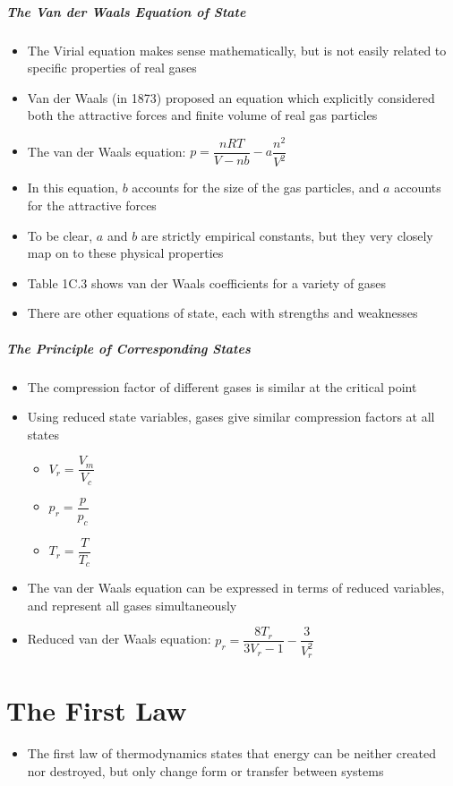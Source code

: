 \documentclass[12pt, openany, letterpaper]{memoir}
\begin{document}
\paragraph{The Van der Waals Equation of State}
\begin{itemize}
	\item The Virial equation makes sense mathematically, but is not easily related to specific properties of real gases
	\item Van der Waals (in 1873) proposed an equation which explicitly considered both the attractive forces and finite volume of real gas particles
	\item The van der Waals equation: $p=\dfrac{nRT}{V-nb}-a\dfrac{n^2}{V^2}$
	\item In this equation, $b$ accounts for the size of the gas particles, and $a$ accounts for the attractive forces
	\item To be clear, $a$ and $b$ are strictly empirical constants, but they very closely map on to these physical properties
	\item Table 1C.3 shows van der Waals coefficients for a variety of gases
	\item There are other equations of state, each with strengths and weaknesses
\end{itemize}
\paragraph{The Principle of Corresponding States}
\begin{itemize}
	\item The compression factor of different gases is similar at the critical point
	\item Using reduced state variables, gases give similar compression factors at all states
	\begin{itemize}
		\item $V_r = \dfrac{V_m}{V_c}$
		\item $p_r=\dfrac{p}{p_c}$
		\item $T_r=\dfrac{T}{T_c}$
	\end{itemize}
	\item The van der Waals equation can be expressed in terms of reduced variables, and represent all gases simultaneously
	\item Reduced van der Waals equation: $p_r = \dfrac{8T_r}{3V_r-1}-\dfrac{3}{V_r^2}$
\end{itemize}
\chapter{The First Law}
\begin{itemize}
	\item The first law of thermodynamics states that energy can be neither created nor destroyed, but only change form or transfer between systems
\end{itemize}
\end{document}
